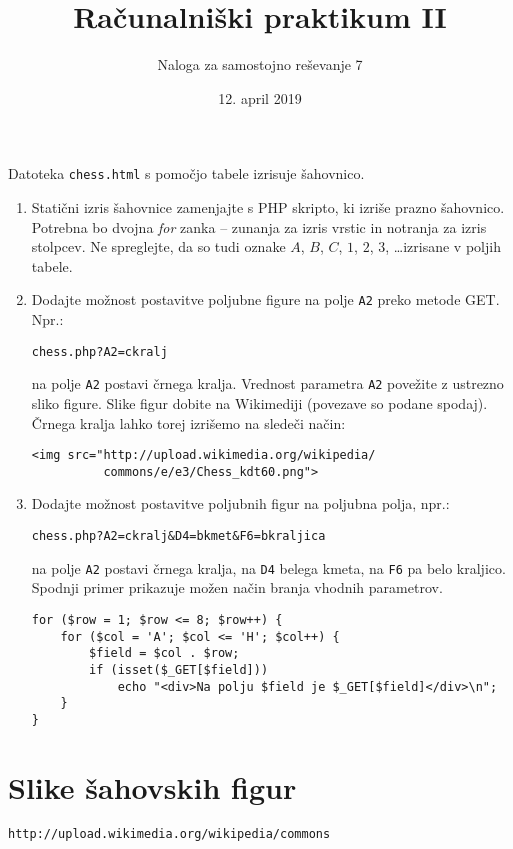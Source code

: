 \documentclass[a4paper,12pt]{article}
\title{Računalniški praktikum II}
\author{Naloga za samostojno reševanje 7}
\date{12. april 2019}
\begin{document}
\maketitle
\thispagestyle{empty}

\noindent
Datoteka \texttt{chess.html} s pomočjo tabele izrisuje šahovnico.
\begin{enumerate}
\item Statični izris šahovnice zamenjajte s PHP skripto, ki izriše prazno šahovnico. Potrebna bo dvojna \emph{for} zanka -- zunanja za izris vrstic in notranja za izris stolpcev. Ne spreglejte, da so tudi oznake $A$, $B$, $C$, $1$, $2$, $3$, \ldots izrisane v poljih tabele.

\item Dodajte možnost postavitve poljubne figure na polje \texttt{A2} preko metode GET. Npr.:
\begin{verbatim}
chess.php?A2=ckralj
\end{verbatim}
na polje \texttt{A2} postavi črnega kralja. Vrednost parametra \texttt{A2} povežite z ustrezno sliko figure. Slike figur dobite na Wikimediji (povezave so podane spodaj). Črnega kralja lahko torej izrišemo na sledeči način:
\begin{verbatim}
<img src="http://upload.wikimedia.org/wikipedia/
          commons/e/e3/Chess_kdt60.png">
\end{verbatim}

\item Dodajte možnost postavitve poljubnih figur na poljubna polja, npr.:
\begin{verbatim}
chess.php?A2=ckralj&D4=bkmet&F6=bkraljica
\end{verbatim}
na polje \texttt{A2} postavi črnega kralja, na \texttt{D4} belega kmeta, na \texttt{F6} pa belo kraljico. Spodnji primer prikazuje možen način branja vhodnih parametrov.

\begin{verbatim}
for ($row = 1; $row <= 8; $row++) {
    for ($col = 'A'; $col <= 'H'; $col++) {
        $field = $col . $row;
        if (isset($_GET[$field]))
            echo "<div>Na polju $field je $_GET[$field]</div>\n";
    }
}
\end{verbatim}
\end{enumerate}

\section*{Slike šahovskih figur}
\texttt{http://upload.wikimedia.org/wikipedia/commons}
\end{document}
